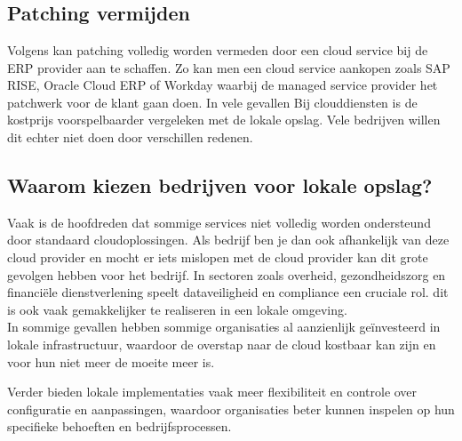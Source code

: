 
\chapter{}
\label{ch:corpus}

\section{Patching vermijden}

Volgens \textcite{Munck2024} kan patching volledig worden vermeden door een cloud service bij de ERP provider aan te schaffen. Zo kan men een cloud service aankopen zoals SAP RISE, Oracle Cloud ERP of Workday waarbij de managed service provider het patchwerk voor de klant gaan doen. In vele gevallen Bij clouddiensten is de kostprijs voorspelbaarder vergeleken met de lokale opslag. Vele bedrijven
 willen dit echter niet doen door verschillen redenen.\\


\section{Waarom kiezen bedrijven voor lokale opslag?}
Vaak is de hoofdreden dat sommige services niet volledig worden ondersteund door standaard cloudoplossingen. Als bedrijf ben je dan ook afhankelijk van deze cloud provider en mocht er iets mislopen met de cloud provider kan dit grote gevolgen hebben voor het bedrijf.
In sectoren zoals overheid, gezondheidszorg en financiële dienstverlening speelt dataveiligheid en compliance een cruciale rol. dit is ook vaak gemakkelijker te realiseren in een lokale omgeving.\\ 

In sommige gevallen hebben sommige organisaties al aanzienlijk geïnvesteerd in lokale infrastructuur, waardoor de overstap naar de cloud kostbaar kan zijn en voor hun niet meer de moeite meer is.

Verder bieden lokale implementaties vaak meer flexibiliteit en controle over configuratie en aanpassingen, waardoor organisaties beter kunnen inspelen op hun specifieke behoeften en 
bedrijfsprocessen.\\



